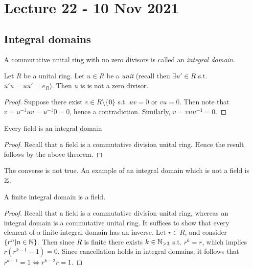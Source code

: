 \section{Lecture 22 - 10 Nov 2021}
\subsection{Integral domains}
\begin{definition}
  A commutative unital ring with no zero divisors is called an \emph{integral domain}.
  \label{def:integralDomain}
\end{definition}

\begin{theorem}
  Let $R$ be a unital ring. Let $u\in R$ be a \emph{unit} (recall then $\exists u'\in R$
  s.t. $u'u=uu'=e_R$). Then $u$ is is not a zero divisor.
  \label{<+label+>}
\end{theorem}
\begin{proof}
  Suppose there exist $v\in R\setminus \{0\}$ s.t. $uv=0$ or $vu=0$. Then note that
  $v=u^{-1}u v=u^{-1} 0 = 0$, hence a contradiction. Similarly, $v=vuu^{-1}=0$. 
\end{proof}

\begin{corollary}
  Every field is an integral domain
  \label{<+label+>}
\end{corollary}
\begin{proof}
  Recall that a field is a commutative division unital ring. Hence the result follows by
  the above theorem.
\end{proof}
\begin{remark}
  The converse is not true. An example of an integral domain which is not a field is
  $\mathbb Z$.
  \label{<+label+>}
\end{remark}

\begin{theorem}
  A finite integral domain is a field.
\end{theorem}
\begin{proof}
  Recall that a field is a commutative division unital ring, whereas an integral domain is
  a commutative unital ring. It suffices to show that every element of a finite integral
  domain has an inverse. Let $r\in R$, and consider $\{r^n | n\in\mathbb N\}$. Then since $R$ is
  finite there exists $k\in\mathbb N_{>3}$ s.t. $r^k=r$, which implies $r(r^{k-1}-1)=0$. Since
  cancellation holds in integral domains, it follows that $r^{k-1}=1\iff r^{k-2}r=1$.
  
\end{proof}

